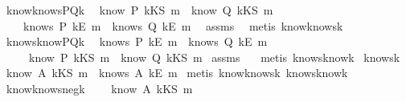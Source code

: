 \begin{isabellebody}
\isamarkupfalse%
%
\endisatagproof
{\isafoldproof}%
%
\isadelimproof
\isanewline
%
\endisadelimproof
\isanewline
{}\isamarkupfalse%
\ know{}knowsPQ{\isacharunderscore}k{\isacharcolon}\ \isanewline
{}\ {\isachardoublequoteopen}know\ P\ {\isacharparenleft}kKS\ m{\isacharparenright}\ {\isasymor}\ know\ Q\ {\isacharparenleft}kKS\ m{\isacharparenright}{\isachardoublequoteclose}\isanewline
{}\ \ \ \ {\isachardoublequoteopen}knows\ P\ {\isacharbrackleft}kE\ m{\isacharbrackright}\ {\isasymor}\ knows\ Q\ {\isacharbrackleft}kE\ m{\isacharbrackright}{\isachardoublequoteclose}\ \isanewline
%
\isadelimproof
%
\endisadelimproof
%
\isatagproof
{}\isamarkupfalse%
\ assms\ \isamarkupfalse%
\ {\isacharparenleft}metis\ know{}knows{\isacharunderscore}k{\isacharparenright}%
\endisatagproof
{\isafoldproof}%
%
\isadelimproof
\isanewline
%
\endisadelimproof
\isanewline
{}\isamarkupfalse%
\ knows{}knowPQ{\isacharunderscore}k{\isacharcolon}\ \isanewline
{}\ {\isachardoublequoteopen}knows\ P\ {\isacharbrackleft}kE\ m{\isacharbrackright}\ {\isasymor}\ knows\ Q\ {\isacharbrackleft}kE\ m{\isacharbrackright}{\isachardoublequoteclose}\isanewline
{}\ \ \ \ \ {\isachardoublequoteopen}know\ P\ {\isacharparenleft}kKS\ m{\isacharparenright}\ {\isasymor}\ know\ Q\ {\isacharparenleft}kKS\ m{\isacharparenright}{\isachardoublequoteclose}\isanewline
%
\isadelimproof
%
\endisadelimproof
%
\isatagproof
{}\isamarkupfalse%
\ assms\ \ \isamarkupfalse%
\ {\isacharparenleft}metis\ knows{}know{\isacharunderscore}k{\isacharparenright}%
\endisatagproof
{\isafoldproof}%
%
\isadelimproof
\isanewline
%
\endisadelimproof
\isanewline
{}\isamarkupfalse%
\ knows{}k{\isacharcolon}\ \isanewline
\ {\isachardoublequoteopen}know\ A\ {\isacharparenleft}kKS\ m{\isacharparenright}\ {\isacharequal}\ knows\ A\ {\isacharbrackleft}kE\ m{\isacharbrackright}{\isachardoublequoteclose}\isanewline
%
\isadelimproof
%
\endisadelimproof
%
\isatagproof
{}\isamarkupfalse%
\ {\isacharparenleft}metis\ know{}knows{\isacharunderscore}k\ knows{}know{\isacharunderscore}k{\isacharparenright}%
\endisatagproof
{\isafoldproof}%
%
\isadelimproof
\ \isanewline
%
\endisadelimproof
\isanewline
{}\isamarkupfalse%
\ know{}knows{\isacharunderscore}neg{\isacharunderscore}k{\isacharcolon}\ \isanewline
{}\ \ {\isachardoublequoteopen}{\isasymnot}\ know\ A\ {\isacharparenleft}kKS\ m{\isacharparenright}{\isachardoublequoteclose}\isanewline

\end{isabellebody}
